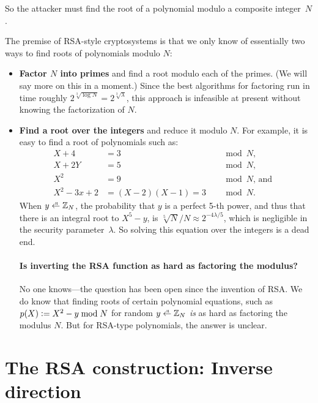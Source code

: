 So the attacker must find the root of a polynomial modulo a composite integer~$N$.

The premise of RSA-style cryptosystems is that we only
know of essentially two ways to find roots of polynomials modulo $N$:
\begin{itemize}
\item \textbf{Factor $N$ into primes} and find a root modulo each of the primes.
      (We will say more on this in a moment.)
      Since the best algorithms for factoring run in time roughly $2^{\sqrt[3]{\log N}} = 2^{\sqrt[3]{\lambda}}$,
      this approach is infeasible at present without knowing the factorization of $N$.

\item \textbf{Find a root over the integers} and reduce it modulo $N$.
      For example, it is easy to find a root of polynomials such as:\\
\begin{align*}
  X + 4 &= 3 &&\mod N,&\\
  X + 2Y &= 5 &&\mod N,&\\
  X^2 &= 9 &&\mod N\text{, and}&\\
  X^2-3x+2 &= (X-2)(X-1) = 3 &&\mod N.
\end{align*}
When $y \getsr \Z_N$, the probability that $y$ is a perfect
5-th power, and thus that there is an integral root to $X^5 - y$,
is $\sqrt[5]{N}/N \approx 2^{-4\lambda/5}$, which is negligible
in the security parameter~$\lambda$.
So solving this equation over the integers is a dead end.

\paragraph{Is inverting the RSA function as hard as factoring the modulus?}
No one knows---the question has been open since the invention of RSA.
We do know that finding roots of certain polynomial equations, such as
$p(X) \mathrel{\mathop:}= X^2 - y \bmod N$ for random $y \getsr \Z_N$ \emph{is} as 
hard as factoring the modulus $N$.
But for RSA-type polynomials, the answer is unclear.

\end{itemize}

\section{The RSA construction: Inverse direction}

